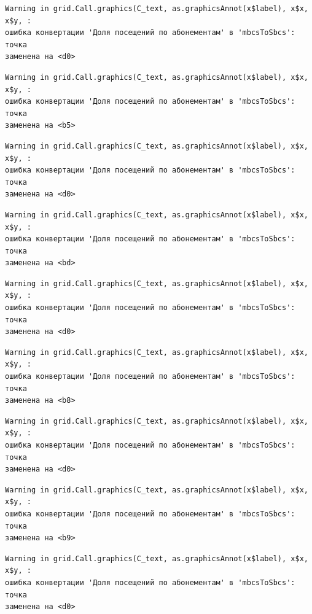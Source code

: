 \documentclass[
  letterpaper,
  DIV=11,
  numbers=noendperiod]{scrreprt}
\begin{document}
\begin{verbatim}
Warning in grid.Call.graphics(C_text, as.graphicsAnnot(x$label), x$x, x$y, :
ошибка конвертации 'Доля посещений по абонементам' в 'mbcsToSbcs': точка
заменена на <d0>
\end{verbatim}

\begin{verbatim}
Warning in grid.Call.graphics(C_text, as.graphicsAnnot(x$label), x$x, x$y, :
ошибка конвертации 'Доля посещений по абонементам' в 'mbcsToSbcs': точка
заменена на <b5>
\end{verbatim}

\begin{verbatim}
Warning in grid.Call.graphics(C_text, as.graphicsAnnot(x$label), x$x, x$y, :
ошибка конвертации 'Доля посещений по абонементам' в 'mbcsToSbcs': точка
заменена на <d0>
\end{verbatim}

\begin{verbatim}
Warning in grid.Call.graphics(C_text, as.graphicsAnnot(x$label), x$x, x$y, :
ошибка конвертации 'Доля посещений по абонементам' в 'mbcsToSbcs': точка
заменена на <bd>
\end{verbatim}

\begin{verbatim}
Warning in grid.Call.graphics(C_text, as.graphicsAnnot(x$label), x$x, x$y, :
ошибка конвертации 'Доля посещений по абонементам' в 'mbcsToSbcs': точка
заменена на <d0>
\end{verbatim}

\begin{verbatim}
Warning in grid.Call.graphics(C_text, as.graphicsAnnot(x$label), x$x, x$y, :
ошибка конвертации 'Доля посещений по абонементам' в 'mbcsToSbcs': точка
заменена на <b8>
\end{verbatim}

\begin{verbatim}
Warning in grid.Call.graphics(C_text, as.graphicsAnnot(x$label), x$x, x$y, :
ошибка конвертации 'Доля посещений по абонементам' в 'mbcsToSbcs': точка
заменена на <d0>
\end{verbatim}

\begin{verbatim}
Warning in grid.Call.graphics(C_text, as.graphicsAnnot(x$label), x$x, x$y, :
ошибка конвертации 'Доля посещений по абонементам' в 'mbcsToSbcs': точка
заменена на <b9>
\end{verbatim}

\begin{verbatim}
Warning in grid.Call.graphics(C_text, as.graphicsAnnot(x$label), x$x, x$y, :
ошибка конвертации 'Доля посещений по абонементам' в 'mbcsToSbcs': точка
заменена на <d0>
\end{verbatim}
\end{document}
